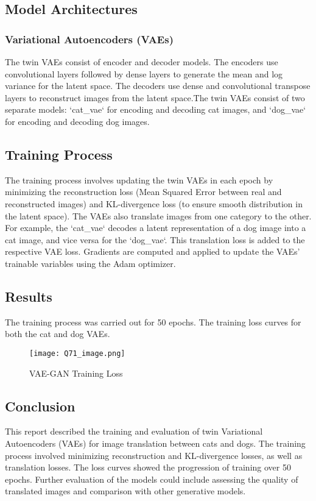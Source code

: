 \documentclass{article}
\begin{document}
\subsection{Model Architectures}

\subsubsection{Variational Autoencoders (VAEs)}
The twin VAEs consist of encoder and decoder models. The encoders use convolutional layers followed by dense layers to generate the mean and log variance for the latent space. The decoders use dense and convolutional transpose layers to reconstruct images from the latent space.The twin VAEs consist of two separate models: `cat_vae` for encoding and decoding cat images, and `dog_vae` for encoding and decoding dog images.

\subsection{Training Process}
The training process involves updating the twin VAEs in each epoch by minimizing the reconstruction loss (Mean Squared Error between real and reconstructed images) and KL-divergence loss (to ensure smooth distribution in the latent space). The VAEs also translate images from one category to the other. For example, the `cat_vae` decodes a latent representation of a dog image into a cat image, and vice versa for the `dog_vae`. This translation loss is added to the respective VAE loss. Gradients are computed and applied to update the VAEs' trainable variables using the Adam optimizer.

\subsection{Results}
The training process was carried out for 50 epochs. The training loss curves for both the cat and dog VAEs. 




\begin{figure}[h]
    \centering
    \texttt{[image: Q71\_image.png]}
    \caption{VAE-GAN Training Loss}
    \label{fig:my_image}
\end{figure}

\subsection{Conclusion}
This report described the training and evaluation of twin Variational Autoencoders (VAEs) for image translation between cats and dogs. The training process involved minimizing reconstruction and KL-divergence losses, as well as translation losses. The loss curves showed the progression of training over 50 epochs. Further evaluation of the models could include assessing the quality of translated images and comparison with other generative models.
\end{document}

